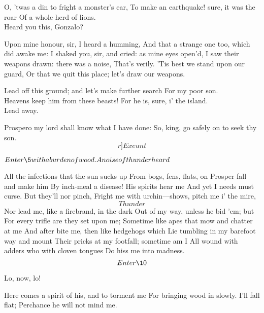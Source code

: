 \documentclass[11pt]{book}
\begin{document}
\7	O, 'twas a din to fright a monster's ear,
	To make an earthquake! sure, it was the roar
	Of a whole herd of lions. \\

\6	Heard you this, Gonzalo?

\9	Upon mine honour, sir, I heard a humming,
	And that a strange one too, which did awake me:
	I shaked you, sir, and cried: as mine eyes open'd,
	I saw their weapons drawn: there was a noise,
	That's verily. 'Tis best we stand upon our guard,
	Or that we quit this place; let's draw our weapons.

\6	Lead off this ground; and let's make further search
	For my poor son. \\

\9	Heavens keep him from these beasts!
	For he is, sure, i' the island. \\

\6	Lead away.

\4	Prospero my lord shall know what I have done:
	So, king, go safely on to seek thy son. \[r]Exeunt\]


	\(Enter \5 with a burden of wood. A noise of thunder heard\)

\5	All the infections that the sun sucks up
	From bogs, fens, flats, on Prosper fall and make him
	By inch-meal a disease! His spirits hear me
	And yet I needs must curse. But they'll nor pinch,
	Fright me with urchin---shows, pitch me i' the mire,
	\[Thunder\]
	Nor lead me, like a firebrand, in the dark
	Out of my way, unless he bid 'em; but
	For every trifle are they set upon me;
	Sometime like apes that mow and chatter at me
	And after bite me, then like hedgehogs which
	Lie tumbling in my barefoot way and mount
	Their pricks at my footfall; sometime am I
	All wound with adders who with cloven tongues
	Do hiss me into madness. \\


	\[Enter \10\]

		    Lo, now, lo!

	Here comes a spirit of his, and to torment me
	For bringing wood in slowly. I'll fall flat;
	Perchance he will not mind me.
\end{document}
